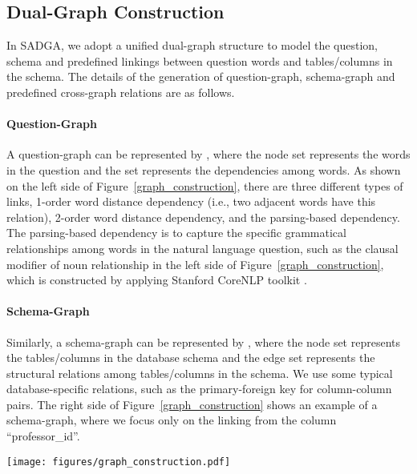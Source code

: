 \documentclass{article}
\begin{document}
\subsection{Dual-Graph Construction}
\label{dual_graph_construction}
In SADGA, we adopt a unified dual-graph structure to model the question, schema and predefined linkings between question words and tables/columns in the schema. The details of the generation of question-graph, schema-graph and predefined cross-graph relations are as follows.

\paragraph{Question-Graph} A question-graph can be represented by , where the node set  represents the words in the question and the set  represents the dependencies among words. As shown on the left side of Figure~\ref{graph_construction}, there are three different types of links, 1-order word distance dependency (i.e., two adjacent words have this relation), 2-order word distance dependency, and the parsing-based dependency.
The parsing-based dependency is to capture the specific grammatical relationships among words in the natural language question, such as the clausal modifier of noun relationship in the left side of Figure~\ref{graph_construction}, which is constructed by applying Stanford CoreNLP toolkit \citep{manning2014stanford}.

\paragraph{Schema-Graph} Similarly, a schema-graph can be represented by , where the node set  represents the tables/columns in the database schema and the edge set  represents the structural relations among tables/columns in the schema. We use some typical database-specific relations, such as the primary-foreign key for column-column pairs. The right side of Figure~\ref{graph_construction} shows an example of a schema-graph, where we focus only on the linking from the column ``professor\_id''.

\begin{figure*}[!thb]
  \centering
  \texttt{[image: figures/graph\_construction.pdf]} 
  \caption{
  The construction of Question-Graph and Schema-Graph.
  } 
  \label{graph_construction}
\end{figure*}
\end{document}
